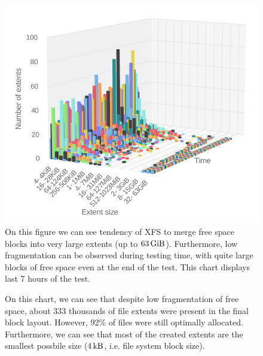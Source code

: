 \documentclass[
  color, %
  table, %
  lof,   %
  lot,   %
]{fithesis3}
\begin{document}
\begin{figure}[!htb]
        \centering
        \includegraphics[width=\textwidth]{../charts/HDD_xfs/free80.png}
        \caption[Free space fragmentation of XFS during testing of medium utilisation of HDD]{On this figure we can see tendency of XFS to merge free space blocks into very large extents (up to $\SI{63}{\gibi\byte}$). Furthermore, low fragmentation can be observed during testing time, with quite large blocks of free space even at the end of the test. This chart displays last 7 hours of the test.}
\label{fig:free80_xfs}
\end{figure}


\begin{figure}[!htb]
    \centering
    \caption[Size distribution of file extents of XFS during testing of medium utilisation of HDD]{On this chart, we can see that despite low fragmentation of free space, about 333 thousands of file extents were present in the final block layout. However, 92\% of files were still optimally allocated. Furthermore, we can see that most of the created extents are the smallest possbile size ($\SI{4}{\kilo\byte}$, i.e. file system block size).}
    \label{fig:used80_xfs}
\end{figure}
\end{document}
